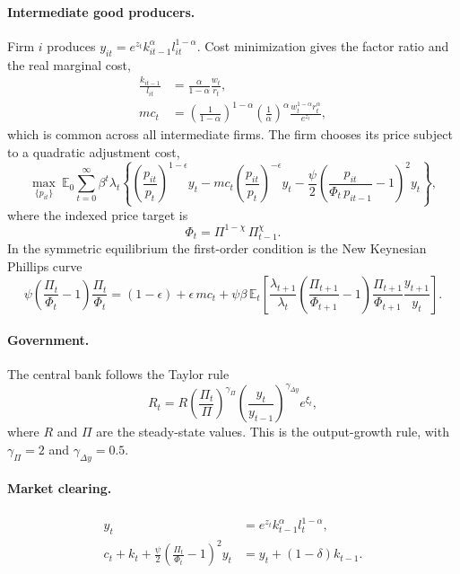 \documentclass[12pt]{article}
\begin{document}
\paragraph{Intermediate good producers.} Firm $i$ produces $y_{it} = e^{z_t} k_{it-1}^{\alpha} l_{it}^{1-\alpha}$. Cost minimization gives the factor ratio and the real marginal cost,
\begin{align}
\frac{k_{it-1}}{l_{it}} &= \frac{\alpha}{1-\alpha} \frac{w_t}{r_t}, \label{eq:factor-ratio} \\
mc_t &= \left( \frac{1}{1-\alpha} \right)^{1-\alpha} \left( \frac{1}{\alpha} \right)^{\alpha} \frac{w_t^{1-\alpha} r_t^{\alpha}}{e^{z_t}} , \label{eq:mc}
\end{align}
which is common across all intermediate firms.
The firm chooses its price subject to a quadratic adjustment cost,
\begin{equation*}
\max_{\{p_{it}\}} \ \mathbb{E}_0 \sum_{t=0}^{\infty} \beta^t \lambda_t \left\{ \left( \frac{p_{it}}{p_t} \right)^{1-\epsilon} y_t - mc_t \left( \frac{p_{it}}{p_t} \right)^{-\epsilon} y_t - \frac{\psi}{2} \left( \frac{p_{it}}{\Phi_t\, p_{it-1}} - 1 \right)^2 y_t \right\},
\end{equation*}
where the indexed price target is
\begin{equation}
\Phi_t = \Pi^{1-\chi}\, \Pi_{t-1}^{\chi} .
\end{equation}
In the symmetric equilibrium the first-order condition is the New Keynesian Phillips curve
\begin{equation}
\psi \left( \frac{\Pi_t}{\Phi_t} - 1 \right) \frac{\Pi_t}{\Phi_t}
= (1 - \epsilon) + \epsilon\, mc_t
+ \psi \beta\, \mathbb{E}_t \left[ \frac{\lambda_{t+1}}{\lambda_t} \left( \frac{\Pi_{t+1}}{\Phi_{t+1}} - 1 \right) \frac{\Pi_{t+1}}{\Phi_{t+1}} \frac{y_{t+1}}{y_t} \right] .
\end{equation}

\paragraph{Government.} The central bank follows the Taylor rule
\begin{equation}
R_t = R \left( \frac{\Pi_t}{\Pi} \right)^{\gamma_\Pi} \left( \frac{y_t}{y_{t-1}} \right)^{\gamma_{\Delta y}} e^{\xi_t}, \label{eq:taylor}
\end{equation}
where $R$ and $\Pi$ are the steady-state values. This is the output-growth rule, with $\gamma_\Pi = 2$ and $\gamma_{\Delta y} = 0.5$.

\paragraph{Market clearing.}
\begin{align}
y_t &= e^{z_t} k_{t-1}^{\alpha} l_t^{1-\alpha}, \\
c_t + k_t + \frac{\psi}{2} \left( \frac{\Pi_t}{\Phi_t} - 1 \right)^2 y_t &= y_t + (1-\delta) k_{t-1} .
\end{align}
\end{document}
